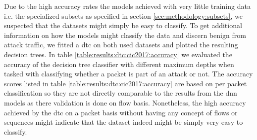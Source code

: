 Due to the high accuracy rates the models achieved with very little training data i.e. the specialized subsets as specified in section \ref{sec:methodology:subsets}, we suspected that the datasets might simply be easy to classify. To get additional information on how the models might classify the data and discern benign from attack traffic, we fitted a \gls{dtc} on both used datasets and plotted the resulting decision trees. In table \ref{table:results:dtc:cic2017:accuracy} we evaluated the accuracy of the decision tree classifier with different maximum depths when tasked with classifying whether a packet is part of an attack or not. The accuracy scores listed in table \ref{table:results:dtc:cic2017:accuracy} are based on per packet classification so they are not directly comparable to the results from the \gls{dnn} models as there validation is done on flow basis. Nonetheless, the high accuracy achieved by the \gls{dtc} on a packet basis without having any concept of flows or sequences might indicate that the dataset indeed might be simply very easy to classify. 

